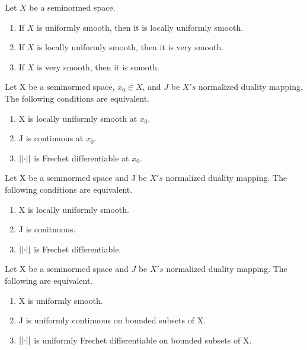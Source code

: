 \begin{prop}
    \label{prop:degreesofsmoothness}
    Let $X$ be a seminormed space. 
    \begin{enumerate}
        \item If $X$ is uniformly smooth, then it is locally uniformly smooth. 
        \item If $X$ is locally uniformly smooth, then it is very smooth.
        \item If $X$ is very smooth, then it is smooth. 
    \end{enumerate} 
\end{prop} 
\begin{prop}
    \label{prop:verysmooth}
\end{prop}
\begin{prop}
    \label{prop:localuniformlysmoothatapoint}
    Let X be a seminormed space, $x_0 \in X$, and $J$ be $X's$ normalized duality mapping. The following conditions are equivalent. 
    \begin{enumerate}
        \item X is locally uniformly smooth at $x_0$.
        \item J is continuous at $x_0$.
        \item $\left|\left| \cdot \right|\right|$ is Frechet differentiable at $x_0$. 
    \end{enumerate} 
\end{prop} 
\begin{cor}
    \label{cor:localuniformlysmooth}
    Let X be a seminormed space and J be $X's$ normalized duality mapping. The following conditions are equivalent.
    \begin{enumerate}
        \item X is locally uniformly smooth.
        \item J is conitnuous.
        \item $\left|\left| \cdot \right|\right|$ is Frechet differentiable. 
    \end{enumerate} 
\end{cor} 
\begin{prop}
    \label{prop:uniformlysmooth}
    Let X be a seminormed space and $J$ be $X's$ normalized duality mapping. The following are equivalent. 
    \begin{enumerate} 
        \item X is uniformly smooth. 
        \item J is uniformly continuous on bounded subsets of X. 
        \item $\left|\left| \cdot \right|\right|$ is uniformly Frechet differentiable on bounded subsets of X.
    \end{enumerate} 
\end{prop} 

